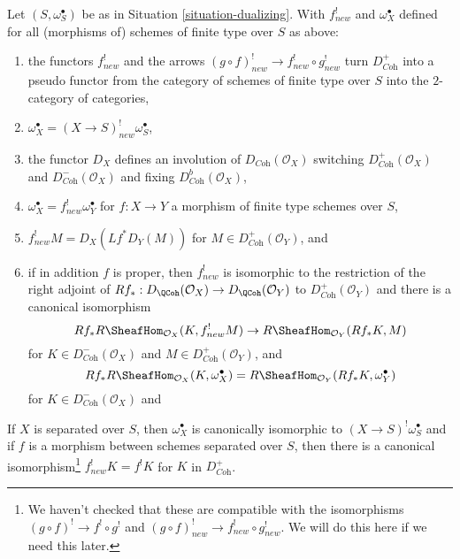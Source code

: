 \begin{lemma}
\label{lemma-duality-bootstrap}
Let $(S, \omega_S^\bullet)$ be as in Situation \ref{situation-dualizing}.
With $f^!_{new}$ and $\omega_X^\bullet$ defined for all (morphisms of)
schemes of finite type over $S$ as above:
\begin{enumerate}
\item the functors $f^!_{new}$ and the arrows
$(g \circ f)^!_{new} \to f^!_{new} \circ g^!_{new}$
turn $D_{\textit{Coh}}^+$ into a pseudo functor from the category of
schemes of finite type over $S$ into the $2$-category of categories,
\item $\omega_X^\bullet = (X \to S)^!_{new} \omega_S^\bullet$,
\item the functor $D_X$
defines an involution of $D_{\textit{Coh}}(\mathcal{O}_X)$
switching $D_{\textit{Coh}}^+(\mathcal{O}_X)$ and
$D_{\textit{Coh}}^-(\mathcal{O}_X)$ and fixing
$D_{\textit{Coh}}^b(\mathcal{O}_X)$,
\item $\omega_X^\bullet = f^!_{new}\omega_Y^\bullet$ for
$f : X \to Y$ a morphism of finite type schemes over $S$,
\item $f^!_{new}M = D_X(Lf^*D_Y(M))$ for
$M \in D_{\textit{Coh}}^+(\mathcal{O}_Y)$, and
\item if in addition $f$ is proper, then $f^!_{new}$ is isomorphic
to the restriction of the right adjoint of
$Rf_* : D_\QCoh(\mathcal{O}_X) \to D_\QCoh(\mathcal{O}_Y)$ to
$D_{\textit{Coh}}^+(\mathcal{O}_Y)$ and there is a canonical isomorphism
$$
Rf_*R\SheafHom_{\mathcal{O}_X}(K, f^!_{new}M)
\to
R\SheafHom_{\mathcal{O}_Y}(Rf_*K, M)
$$
for $K \in D^-_{\textit{Coh}}(\mathcal{O}_X)$ and
$M \in D_{\textit{Coh}}^+(\mathcal{O}_Y)$, and
$$
Rf_*R\SheafHom_{\mathcal{O}_X}(K, \omega_X^\bullet) =
R\SheafHom_{\mathcal{O}_Y}(Rf_*K, \omega_Y^\bullet)
$$
for $K \in D^-_{\textit{Coh}}(\mathcal{O}_X)$ and
\end{enumerate}
If $X$ is separated over $S$, then
$\omega_X^\bullet$ is canonically isomorphic to
$(X \to S)^!\omega_S^\bullet$ and
if $f$ is a morphism between schemes separated
over $S$, then there is a canonical isomorphism\footnote{We haven't
checked that these are compatible with the isomorphisms
$(g \circ f)^! \to f^! \circ g^!$ and
$(g \circ f)^!_{new} \to f^!_{new} \circ g^!_{new}$. We will do this
here if we need this later.}
$f_{new}^!K = f^!K$ for $K$ in $D_{\textit{Coh}}^+$.
\end{lemma}

